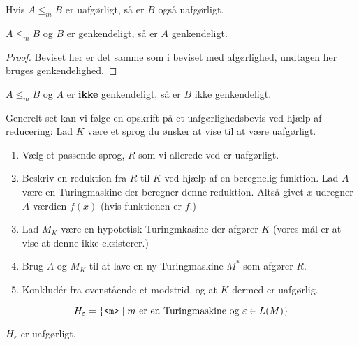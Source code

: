 \begin{corollary}
	Hvis $A \leq _{m}B$ er uafgørligt, så er $B$ også uafgørligt.
\end{corollary}

\begin{theorem}
	$A \leq_{m} B$ og $B$ er genkendeligt, så er $A$ genkendeligt.
\end{theorem}

\begin{proof}
	Beviset her er det samme som i beviset med afgørlighed, undtagen her bruges genkendelighed.
\end{proof}

\begin{corollary}
	$A \leq_m B$ og $A$ er \textbf{ikke} genkendeligt, så er $B$ ikke genkendeligt.
\end{corollary}


Generelt set kan vi følge en opskrift på et uafgørlighedsbevis ved hjælp af reducering:
Lad $K$ være et sprog du ønsker at vise til at være uafgørligt.
\begin{enumerate}

	\item Vælg et passende sprog, $R$ som vi allerede ved er uafgørligt.
	\item Beskriv en reduktion fra $R$ til $K$ ved hjælp af en beregnelig funktion. Lad $A$ være en Turingmaskine der beregner denne reduktion. Altså givet $x$ udregner $A$ værdien $f(x)$ (hvis funktionen er $f$.)
	\item Lad $M_{K}$ være en hypotetisk Turingmkasine der afgører $K$ (vores mål er at vise at denne ikke eksisterer.)
	\item Brug $A$ og $M_{K}$ til at lave en ny Turingmaskine $M^{*}$ som afgører $R$.
	\item Konkludér fra ovenstående et modstrid, og at $K$ dermed er uafgørlig.
\end{enumerate}



\begin{equation*}
	H_{\varepsilon} = \{\text{\texttt{<m>}} \mid m \text{ er en Turingmaskine og } \varepsilon \in L(M)\}
\end{equation*}

\begin{theorem}
	$H_{\varepsilon}$ er uafgørligt.
\end{theorem}

